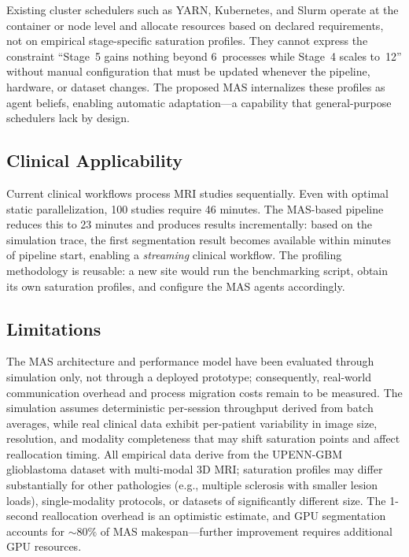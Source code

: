 \documentclass[conference]{IEEEtran}
\begin{document}
Existing cluster schedulers such as YARN, Kubernetes, and Slurm operate at the container or node level and allocate resources based on declared requirements, not on empirical stage-specific saturation profiles. They cannot express the constraint ``Stage~5 gains nothing beyond 6~processes while Stage~4 scales to~12'' without manual configuration that must be updated whenever the pipeline, hardware, or dataset changes. The proposed MAS internalizes these profiles as agent beliefs, enabling automatic adaptation---a capability that general-purpose schedulers lack by design.

\subsection{Clinical Applicability}

Current clinical workflows process MRI studies sequentially. Even with optimal static parallelization, 100 studies require 46 minutes. The MAS-based pipeline reduces this to 23 minutes and produces results incrementally: based on the simulation trace, the first segmentation result becomes available within minutes of pipeline start, enabling a \textit{streaming} clinical workflow. The profiling methodology is reusable: a new site would run the benchmarking script, obtain its own saturation profiles, and configure the MAS agents accordingly.

\subsection{Limitations}

The MAS architecture and performance model have been evaluated through simulation only, not through a deployed prototype; consequently, real-world communication overhead and process migration costs remain to be measured. The simulation assumes deterministic per-session throughput derived from batch averages, while real clinical data exhibit per-patient variability in image size, resolution, and modality completeness that may shift saturation points and affect reallocation timing. All empirical data derive from the UPENN-GBM glioblastoma dataset with multi-modal 3D MRI; saturation profiles may differ substantially for other pathologies (e.g., multiple sclerosis with smaller lesion loads), single-modality protocols, or datasets of significantly different size. The 1-second reallocation overhead is an optimistic estimate, and GPU segmentation accounts for ${\sim}80\%$ of MAS makespan---further improvement requires additional GPU resources.
\end{document}
